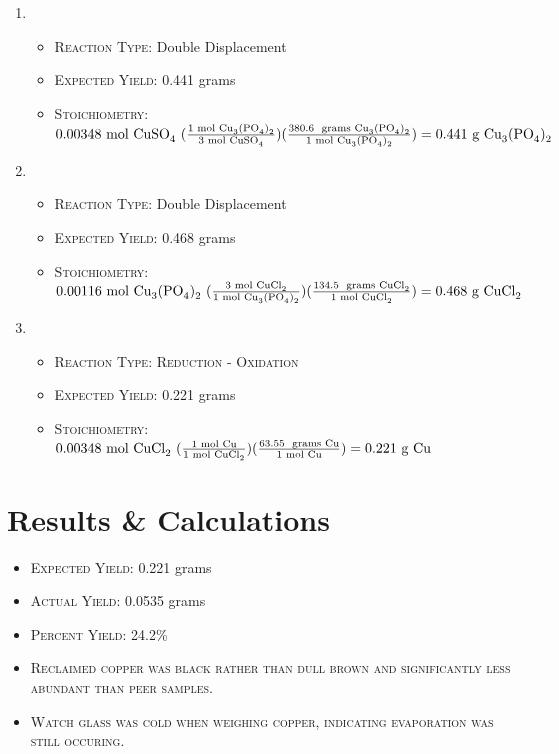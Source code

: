 \documentclass[11pt,letterpaper]{report}
\begin{document}
\begin{enumerate}
\begin{itemize}
\end{itemize}
\item {}
\begin{itemize}
\item \textsc{Reaction Type:} Double Displacement
\item \textsc{Expected Yield:} 0.441 grams
\item \textsc{Stoichiometry:} $0.00348 \text{ mol \ce{CuSO4} } ( \frac{\text{1 mol \ce{Cu3(PO4)2}}}{\text{3 mol \ce{CuSO4}}} ) ( \frac{\text{380.6 \text{ grams} \ce{Cu3(PO4)2}}}{\text{1 mol \ce{Cu3(PO4)2}}} ) = 0.441 \text{ g \ce{Cu3(PO4)2}}$
\end{itemize}
\item {}
\begin{itemize}
\item \textsc{Reaction Type:} Double Displacement
\item \textsc{Expected Yield:} 0.468 grams
\item \textsc{Stoichiometry:}  $0.00116  \text{ mol \ce{Cu3(PO4)2} } ( \frac{\text{3 mol \ce{CuCl2}}}{\text{1 mol \ce{Cu3(PO4)2}}} ) ( \frac{\text{134.5 \text{ grams} \ce{CuCl2}}}{\text{1 mol \ce{CuCl2}}} ) = 0.468 \text{ g \ce{CuCl2}}$
\end{itemize}
\item {}\\
\begin{itemize}
\item \textsc{Reaction Type: Reduction - Oxidation} 
\item \textsc{Expected Yield:} 0.221 grams
\item \textsc{Stoichiometry:} $0.00348 \text{ mol \ce{CuCl2} } ( \frac{\text{1 mol \ce{Cu}}}{\text{1 mol \ce{CuCl2}}} ) ( \frac{\text{63.55 \text{ grams} \ce{Cu}}}{\text{1 mol \ce{Cu}}} ) = 0.221 \text{ g \ce{Cu}}$
\end{itemize}
\end{enumerate}


\section*{Results \& Calculations}
\begin{itemize}
\item \textsc{Expected Yield:} 0.221 grams
\item \textsc{Actual Yield:} 0.0535 grams
\item \textsc{Percent Yield:} 24.2\%
\item \textsc{Reclaimed copper was black rather than dull brown and significantly less abundant than peer samples.}
\item \textsc{Watch glass was cold when weighing copper, indicating evaporation was still occuring.}
\end{itemize}
\end{document}
